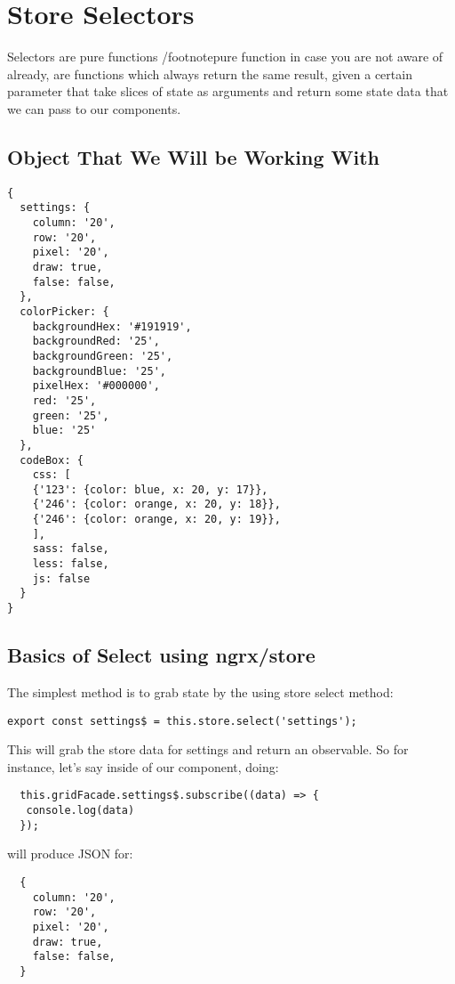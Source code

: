
\chapter{ Store Selectors }

Selectors are pure functions /footnote{pure function in case you are not aware
of already, are functions which always return the same result, given a certain
parameter} that take slices of state as arguments and return some state data
that we can pass to our components.


\section{Object That We Will be Working With}
\begin{verbatim}
{
  settings: {
    column: '20',
    row: '20',
    pixel: '20',
    draw: true,
    false: false,
  },
  colorPicker: {
    backgroundHex: '#191919',
    backgroundRed: '25',
    backgroundGreen: '25',
    backgroundBlue: '25',
    pixelHex: '#000000',
    red: '25',
    green: '25',
    blue: '25'
  },
  codeBox: {
    css: [
    {'123': {color: blue, x: 20, y: 17}},
    {'246': {color: orange, x: 20, y: 18}},
    {'246': {color: orange, x: 20, y: 19}},
    ],
    sass: false,
    less: false,
    js: false
  }
}
\end{verbatim}

\section{Basics of Select using ngrx/store}

The simplest method is to grab state by the using store select method:
\begin{lstlisting}
export const settings$ = this.store.select('settings');
\end{lstlisting}

This will grab the store data for settings and return an observable. So for
instance, let's say inside of our component, doing:
\begin{lstlisting}
  this.gridFacade.settings$.subscribe((data) => {
   console.log(data)
  });
\end{lstlisting}
 will produce JSON for:
\begin{verbatim}
  {
    column: '20',
    row: '20',
    pixel: '20',
    draw: true,
    false: false,
  }
\end{verbatim}

